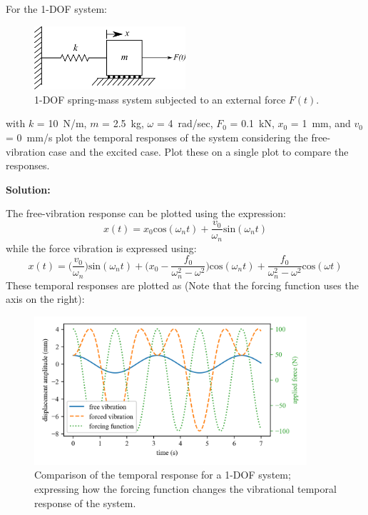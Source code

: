 \documentclass[12pt,letter]{article}
\begin{document}
	\begin{example}
		For the 1-DOF system:
		\begin{figure}[H]
			\centering
			\includegraphics[width=0.5\textwidth]{../figures/1-DOF-spring_mass_horizontal_forced.png}
			\caption{1-DOF spring-mass system subjected to an external force $F(t)$.}
		\end{figure}
		with $k$ = 10~N/m, $m$ = 2.5~kg, $\omega$ = 4~rad/sec, $F_0$ = 0.1~kN, $x_0$ = 1~mm, and $v_0$ = 0~mm/s plot the temporal responses of the system considering the free-vibration case and the excited case. Plot these on a single plot to compare the responses. 
					
		\noindent\textbf{Solution:} 

		The free-vibration response can be plotted using the expression:
		\begin{equation}
			x(t) = x_0\text{cos}(\omega_n t) + \frac{v_0}{\omega_n}\text{sin}(\omega_n t)
		\end{equation}				
		while the force vibration is expressed using:
		\begin{equation}
			x(t) = \Big(\frac{v_0}{\omega_n}\Big)\text{sin}(\omega_n t) + \Big(x_0-\frac{f_0}{\omega_n^2-\omega^2}\Big)\text{cos}(\omega_n t) + \frac{f_0}{\omega_n^2-\omega^2}\text{cos}(\omega t)
		\end{equation}	
		These temporal responses are plotted as (Note that the forcing function uses the axis on the right):
		\begin{figure}[H]
			\centering
			\includegraphics[width=0.9\textwidth]{../figures/free_and_forced_temporal_response.png}
			\caption{Comparison of the temporal response for a 1-DOF system; expressing how the forcing function changes the vibrational  temporal response of the system.}
		\end{figure}	
	\end{example}
	
\end{document}
